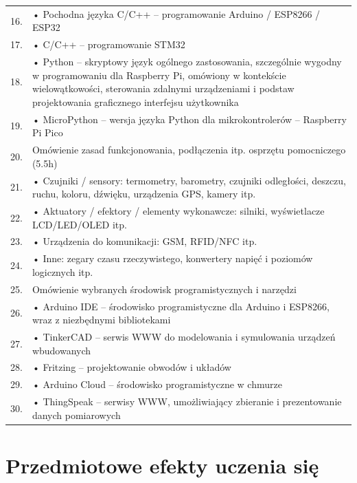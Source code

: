 \documentclass[12pt, a4paper]{article}
\begin{document}
{\begin{longtable}{m{1.5cm}m{14.5cm}}
  \rowcolor{tableRowAlt} 16. & • Pochodna języka C/C++ – programowanie Arduino / ESP8266 / ESP32 \\
  \rowcolor{tableRowLight} 17. & • C/C++ – programowanie STM32 \\
  \rowcolor{tableRowAlt} 18. & • Python – skryptowy język ogólnego zastosowania, szczególnie wygodny w programowaniu dla Raspberry Pi, omówiony w kontekście wielowątkowości, sterowania zdalnymi urządzeniami i podstaw projektowania graficznego interfejsu użytkownika \\
  \rowcolor{tableRowLight} 19. & • MicroPython – wersja języka Python dla mikrokontrolerów – Raspberry Pi Pico \\
  \rowcolor{tableRowAlt} 20. & Omówienie zasad funkcjonowania, podłączenia itp. osprzętu pomocniczego (5.5h) \\
  \rowcolor{tableRowLight} 21. & • Czujniki / sensory: termometry, barometry, czujniki odległości, deszczu, ruchu, koloru, dźwięku, urządzenia GPS, kamery itp. \\
  \rowcolor{tableRowAlt} 22. & • Aktuatory / efektory / elementy wykonawcze: silniki, wyświetlacze LCD/LED/OLED itp. \\
  \rowcolor{tableRowLight} 23. & • Urządzenia do komunikacji: GSM, RFID/NFC itp. \\
  \rowcolor{tableRowAlt} 24. & • Inne: zegary czasu rzeczywistego, konwertery napięć i poziomów logicznych itp. \\
  \rowcolor{tableRowLight} 25. & Omówienie wybranych środowisk programistycznych i narzędzi \\
  \rowcolor{tableRowAlt} 26. & • Arduino IDE – środowisko programistyczne dla Arduino i ESP8266, wraz z niezbędnymi bibliotekami \\
  \rowcolor{tableRowLight} 27. & • TinkerCAD – serwis WWW do modelowania i symulowania urządzeń wbudowanych \\
  \rowcolor{tableRowAlt} 28. & • Fritzing – projektowanie obwodów i układów \\
  \rowcolor{tableRowLight} 29. & • Arduino Cloud – środowisko programistyczne w chmurze \\
  \rowcolor{tableRowAlt} 30. & • ThingSpeak – serwisy WWW, umożliwiający zbieranie i prezentowanie danych pomiarowych \\
\bottomrule
\end{longtable}}

\section{Przedmiotowe efekty uczenia się}
\end{document}
